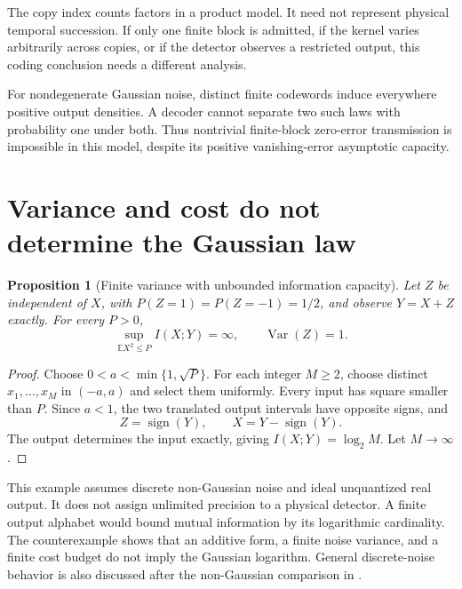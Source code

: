 \documentclass{article}
\newtheorem{proposition}[theorem]{Proposition}
\begin{document}
The copy index counts factors in a product model. It need not represent physical temporal succession. If only one finite block is admitted, if the kernel varies arbitrarily across copies, or if the detector observes a restricted output, this coding conclusion needs a different analysis.

For nondegenerate Gaussian noise, distinct finite codewords induce everywhere positive output densities. A decoder cannot separate two such laws with probability one under both. Thus nontrivial finite-block zero-error transmission is impossible in this model, despite its positive vanishing-error asymptotic capacity.

\section{Variance and cost do not determine the Gaussian law}
\begin{proposition}[Finite variance with unbounded information capacity]
Let \(Z\) be independent of \(X\), with \(P(Z=1)=P(Z=-1)=1/2\), and observe \(Y=X+Z\) exactly. For every \(P>0\),
\[
\sup_{\mathbb E X^2\le P}I(X;Y)=\infty,
\qquad \operatorname{Var}(Z)=1.
\]
\end{proposition}
\begin{proof}
Choose \(0<a<\min\{1,\sqrt P\}\). For each integer \(M\ge2\), choose distinct \(x_1,\ldots,x_M\) in \((-a,a)\) and select them uniformly. Every input has square smaller than \(P\). Since \(a<1\), the two translated output intervals have opposite signs, and
\[
Z=\operatorname{sign}(Y),\qquad X=Y-\operatorname{sign}(Y).
\]
The output determines the input exactly, giving \(I(X;Y)=\log_2M\). Let \(M\to\infty\).
\end{proof}

This example assumes discrete non-Gaussian noise and ideal unquantized real output. It does not assign unlimited precision to a physical detector. A finite output alphabet would bound mutual information by its logarithmic cardinality. The counterexample shows that an additive form, a finite noise variance, and a finite cost budget do not imply the Gaussian logarithm. General discrete-noise behavior is also discussed after the non-Gaussian comparison in \cite{polyanskiy17}.
\end{document}
